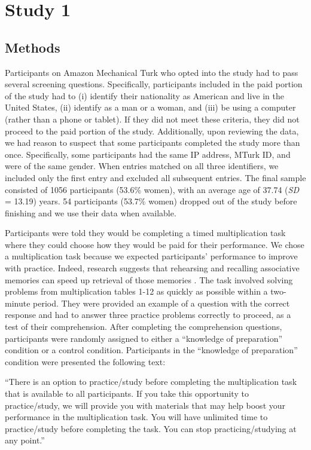 \documentclass[a4paper, nobind]{templates/ociamthesis}
\begin{document}
\hypertarget{study-1}{%
\section{Study 1}\label{study-1}}

\hypertarget{methods}{%
\subsection{Methods}\label{methods}}

Participants on Amazon Mechanical Turk who opted into the study had to pass several screening questions. Specifically, participants included in the paid portion of the study had to (i) identify their nationality as American and live in the United States, (ii) identify as a man or a woman, and (iii) be using a computer (rather than a phone or tablet). If they did not meet these criteria, they did not proceed to the paid portion of the study. Additionally, upon reviewing the data, we had reason to suspect that some participants completed the study more than once. Specifically, some participants had the same IP address, MTurk ID, and were of the same gender. When entries matched on all three identifiers, we included only the first entry and excluded all subsequent entries. The final sample consisted of 1056 participants (53.6\% women), with an average age of 37.74 (\emph{SD} = 13.19) years. 54 participants (53.7\% women) dropped out of the study before finishing and we use their data when available.

Participants were told they would be completing a timed multiplication task where they could choose how they would be paid for their performance. We chose a multiplication task because we expected participants' performance to improve with practice. Indeed, research suggests that rehearsing and recalling associative memories can speed up retrieval of those memories \autocite{Rundus1971}. The task involved solving problems from multiplication tables 1-12 as quickly as possible within a two-minute period. They were provided an example of a question with the correct response and had to answer three practice problems correctly to proceed, as a test of their comprehension. After completing the comprehension questions, participants were randomly assigned to either a ``knowledge of preparation'' condition or a control condition. Participants in the ``knowledge of preparation'' condition were presented the following text:

``There is an option to practice/study before completing the multiplication task that is available to all participants. If you take this opportunity to practice/study, we will provide you with materials that may help boost your performance in the multiplication task. You will have unlimited time to practice/study before completing the task. You can stop practicing/studying at any point.''
\end{document}
